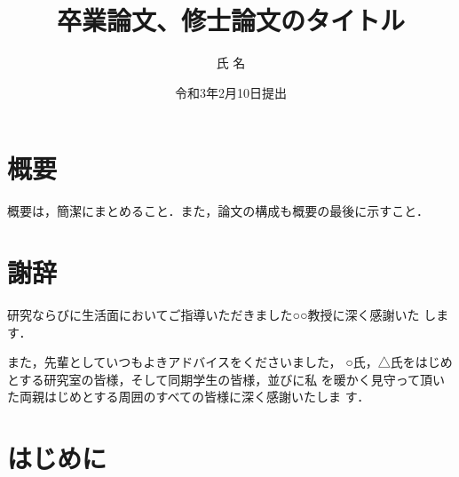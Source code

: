 \documentclass[12pt,epsf]{jreport}
\begin{document}

\title{卒業論文、修士論文のタイトル} 


\author{氏 名}


\date{令和3年2月10日提出}




\maketitle

\setcounter{page}{1}
\chapter*{概要}

 概要は，簡潔にまとめること．また，論文の構成も概要の最後に示すこと．



\chapter*{謝辞}


研究ならびに生活面においてご指導いただきました○○教授に深く感謝いた
します．

また，先輩としていつもよきアドバイスをくださいました，
○氏，△氏をはじめとする研究室の皆様，そして同期学生の皆様，並びに私
を暖かく見守って頂いた両親はじめとする周囲のすべての皆様に深く感謝いたしま
す．

\tableofcontents %
\listoffigures %
\listoftables %


\chapter{はじめに} \label{chap:intro}
\setcounter{page}{1}   %
\end{document}
